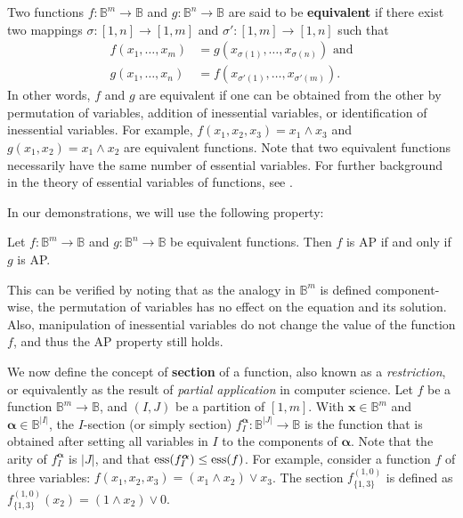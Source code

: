 Two functions $f\colon \mathbb{B}^m\to \mathbb{B}$ and $g\colon \mathbb{B}^n\to
\mathbb{B}$ are said to be {\bf equivalent} if there exist two mappings
$\sigma\colon
[1,n]\to [1,m]$ and $\sigma'\colon [1,m]\to [1,n]$ such that
\begin{align*}
  f(x_1,\ldots , x_m)&=g(x_{\sigma(1)},\ldots,x_{\sigma(n)}) \text{ and} \\
   g(x_1,\ldots , x_n)&=f(x_{\sigma'(1)},\ldots,x_{\sigma'(m)}).
\end{align*}
In other words, $f$ and $g$ are equivalent if one can be obtained from the
other by permutation of variables, addition of inessential variables, or
identification of inessential variables. For example, $f(x_1, x_2, x_3) = x_1
\wedge x_3$ and $g(x_1, x_2)  = x_1 \wedge x_2$ are equivalent functions. Note
that two equivalent functions necessarily have the same number of essential
variables. For further background in the theory of essential variables of
functions, see \cite{CouceiroTCS2008,CouceiroDM2009,SalomaaAASF1963,WillardDM1996}.

In our demonstrations, we will use the following property:

\begin{property}\label{equivalent_functions}
Let $f\colon \mathbb{B}^m\to \mathbb{B}$ and $g\colon \mathbb{B}^n\to
  \mathbb{B}$ be equivalent functions. Then $f$ is AP if and only if $g$ is AP.
\end{property}

This can be verified by noting that as the analogy in $\mathbb{B}^m$ is defined
component-wise, the permutation of variables has no effect on the equation and
its solution. Also, manipulation of inessential variables do not change the
value of the function $f$, and thus the AP property still holds.

We now define the concept of \textbf{section} of a function, also known as a
\textit{restriction}, or equivalently as the result of \textit{partial
application} in computer science. Let $f$ be a function $\mathbb{B}^m\to \mathbb{B}$, and $(I,
J)$ be a partition of $[1, m]$. With $\mathbf{x}
\in \mathbb{B}^m$ and $\boldsymbol{\alpha} \in \mathbb{B}^{|I|}$, the $I$-section (or simply
section) $f^{\boldsymbol{\alpha}}_I \colon \mathbb{B}^{|J|} \to \mathbb{B}$ is the function that
is obtained after setting all variables in $I$ to the components of
$\boldsymbol{\alpha}$. Note that the arity of $f^{\boldsymbol{\alpha}}_I$ is
$|J|$, and that $\operatorname{ess}(f^{\boldsymbol{\alpha}}_I) \leq \operatorname{ess}(f)$.
For example, consider a function $f$ of three variables: $f(x_1,x_2, x_3) = (x_1
\wedge x_2) \lor x_3$. The section $f^{(1, 0)}_{\{1, 3\}}$ is defined as $f^{(1,
0)}_{\{1, 3\}}(x_2) = (1 \wedge x_2) \lor 0$.

